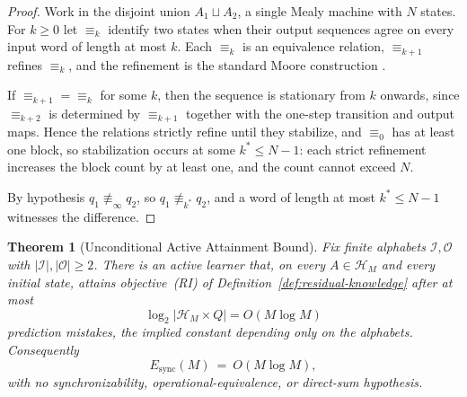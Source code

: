 \documentclass[12pt]{article}
\newtheorem{theorem}{Theorem}[section]
\theoremstyle{definition}
\newcommand{\Esync}{E_{\mathrm{sync}}}
\begin{document}
\begin{proof}
Work in the disjoint union $A_1\sqcup A_2$, a single Mealy machine with $N$
states.  For $k\ge0$ let $\equiv_k$ identify two states when their output
sequences agree on every input word of length at most $k$.  Each $\equiv_k$ is
an equivalence relation, $\equiv_{k+1}$ refines $\equiv_k$, and the
refinement is the standard Moore construction
\cite[Ch.~II]{sakarovitch2009}.

If $\equiv_{k+1}=\equiv_k$ for some $k$, then the sequence is stationary from
$k$ onwards, since $\equiv_{k+2}$ is determined by $\equiv_{k+1}$ together with
the one-step transition and output maps.  Hence the relations strictly refine
until they stabilize, and $\equiv_0$ has at least one block, so stabilization
occurs at some $k^\ast\le N-1$: each strict refinement increases the block
count by at least one, and the count cannot exceed $N$.

By hypothesis $q_1\not\equiv_\infty q_2$, so $q_1\not\equiv_{k^\ast}q_2$, and a
word of length at most $k^\ast\le N-1$ witnesses the difference.
\end{proof}

\begin{theorem}[Unconditional Active Attainment Bound]
\label{thm:active-halving}
Fix finite alphabets $\mathcal I,\mathcal O$ with $|\mathcal I|,|\mathcal O|\ge2$.
There is an active learner that, on every $A\in\mathcal H_M$ and every initial
state, attains objective~(RI) of Definition~\ref{def:residual-knowledge} after
at most
\[
\log_2\bigl|\mathcal H_M\times Q\bigr|
=
O(M\log M)
\]
prediction mistakes, the implied constant depending only on the alphabets.
Consequently
\[
\Esync(M)\ =\ O(M\log M),
\]
with no synchronizability, operational-equivalence, or direct-sum hypothesis.
\end{theorem}
\end{document}
